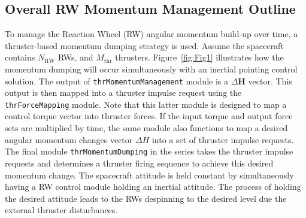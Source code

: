 \documentclass[]{BasiliskReportMemo}
\begin{document}
\subsection{Overall RW Momentum Management Outline}
To manage the Reaction Wheel (RW) angular momentum build-up over time, a thruster-based momentum dumping strategy is used. Assume the spacecraft contains $N_{\text{RW}}$ RWs, and $M_{\text{thr}}$ thrusters.  Figure~\ref{fig:Fig1} illustrates how the momentum dumping will occur simultaneously with an inertial pointing control solution.   The output of {\tt thrMomentumManagement} module is a $\Delta \bm H$ vector.  This output is then mapped into a thruster impulse request using the {\tt thrForceMapping} module.  Note that this latter module is designed to map a control torque vector into thruster forces.  If the input torque and output force sets are multiplied by time,  the same module also functions to map a desired angular momentum changes vector $\Delta H$ into a set of thruster impulse requests.  The final module {\tt thrMomentumDumping} in the series takes the thruster impulse requests and determines a thruster firing sequence to achieve this desired momentum change.  The spacecraft attitude is held constant by simultaneously having a RW control module holding an inertial attitude.  The process of holding the desired attitude leads to the RWs despinning to the desired level due the external thruster disturbances.  
\end{document}
